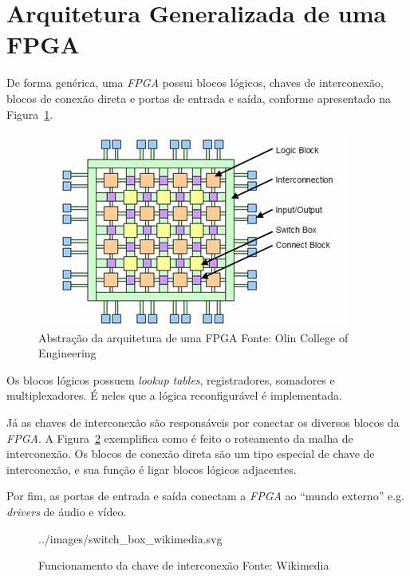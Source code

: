 \clearpage

\section{Arquitetura Generalizada de uma FPGA}
{
    De forma genérica, uma \textit{FPGA} possui blocos lógicos, chaves de
    interconexão, blocos de conexão direta e portas de entrada e saída,
    conforme apresentado na Figura~\ref{fig:fpga_general_arch}.
}

\begin{figure}[H]
\centering
\includegraphics[width=.7\linewidth]
    {../images/fpga_architecture_abstraction_-_olin_college.jpg}
    \caption[Abstração da arquitetura de uma FPGA]
        {Abstração da arquitetura de uma FPGA \quad Fonte: Olin College of
            Engineering}\label{fig:fpga_general_arch}
\end{figure}

{
    Os blocos lógicos possuem \textit{lookup tables}, registradores, somadores
    e multiplexadores. É neles que a lógica reconfigurável é implementada.
}

{
    Já as chaves de interconexão são responsáveis por conectar os diversos
    blocos da \textit{FPGA}. A Figura~\ref{fig:fpga_switch_box} exemplifica
    como é feito o roteamento da malha de interconexão. Os blocos de conexão
    direta são um tipo especial de chave de interconexão, e sua função é ligar
    blocos lógicos adjacentes.
}

{
    Por fim, as portas de entrada e saída conectam a \textit{FPGA} ao ``mundo
    externo'' e.g. \textit{drivers} de áudio e vídeo.
}

\begin{figure}[H]
\centering

    {../images/switch_box_wikimedia.svg}
    \caption[Funcionamento da chave de interconexão]
        {Funcionamento da chave de interconexão \quad Fonte: Wikimedia
        }\label{fig:fpga_switch_box}
\end{figure}

